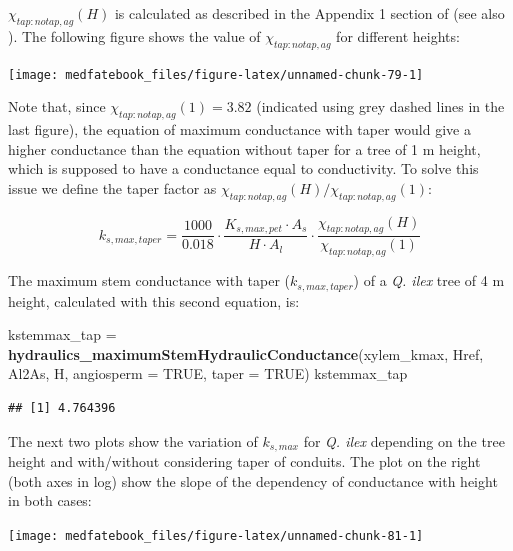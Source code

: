 \documentclass[]{book}
\newenvironment{Shaded}{\begin{snugshade}}{\end{snugshade}}
\newcommand{\KeywordTok}[1]{\textcolor[rgb]{0.13,0.29,0.53}{\textbf{#1}}}
\newcommand{\DataTypeTok}[1]{\textcolor[rgb]{0.13,0.29,0.53}{#1}}
\newcommand{\StringTok}[1]{\textcolor[rgb]{0.31,0.60,0.02}{#1}}
\newcommand{\OtherTok}[1]{\textcolor[rgb]{0.56,0.35,0.01}{#1}}
\newcommand{\NormalTok}[1]{#1}
\begin{document}
\(\chi_{tap:notap,ag}(H)\) is calculated as described in the Appendix 1
section of \citet{Christoffersen2016} (see also \citet{Savage2010}). The
following figure shows the value of \(\chi_{tap:notap,ag}\) for
different heights:

\begin{center}\texttt{[image: medfatebook\_files/figure-latex/unnamed-chunk-79-1]} \end{center}

Note that, since \(\chi_{tap:notap,ag}(1) = 3.82\) (indicated using grey
dashed lines in the last figure), the equation of maximum conductance
with taper would give a higher conductance than the equation without
taper for a tree of 1 m height, which is supposed to have a conductance
equal to conductivity. To solve this issue we define the taper factor as
\(\chi_{tap:notap,ag}(H)/\chi_{tap:notap,ag}(1)\):

\begin{equation}
k_{s, max, taper}=\frac{1000}{0.018} \cdot \frac{K_{s,max,pet}\cdot A_{s}}{H\cdot A_{l}}\cdot \frac{\chi_{tap:notap,ag}(H)}{\chi_{tap:notap,ag}(1)}
\end{equation}

The maximum stem conductance with taper (\(k_{s, max, taper}\)) of a
\emph{Q. ilex} tree of 4 m height, calculated with this second equation,
is:

\begin{Shaded}
\begin{Highlighting}[]
\NormalTok{kstemmax_tap =}\StringTok{ }\KeywordTok{hydraulics_maximumStemHydraulicConductance}\NormalTok{(xylem_kmax, }
\NormalTok{                      Href, Al2As, H, }\DataTypeTok{angiosperm =} \OtherTok{TRUE}\NormalTok{, }\DataTypeTok{taper =} \OtherTok{TRUE}\NormalTok{)}
\NormalTok{kstemmax_tap}
\end{Highlighting}
\end{Shaded}

\begin{verbatim}
## [1] 4.764396
\end{verbatim}

The next two plots show the variation of \(k_{s,max}\) for \emph{Q.
ilex} depending on the tree height and with/without considering taper of
conduits. The plot on the right (both axes in log) show the slope of the
dependency of conductance with height in both cases:

\begin{center}\texttt{[image: medfatebook\_files/figure-latex/unnamed-chunk-81-1]} \end{center}
\end{document}
